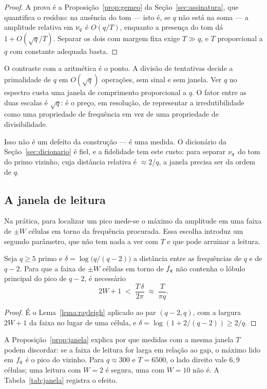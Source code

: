 \begin{proof}
A prova é a Proposição~\ref{prop:gemeo} da Seção~\ref{sec:assinatura}, que
quantifica o resíduo: na ausência do tom — isto é, se $q$ não está na soma — a
amplitude relativa em $\nu_{q}$ é $O(q/T)$, enquanto a presença do tom dá
$1+O(\sqrt q/T)$. Separar os dois com margem fixa exige $T\gg q$, e $T$
proporcional a $q$ com constante adequada basta.
\end{proof}

O contraste com a aritmética é o ponto. A divisão de tentativas decide a
primalidade de $q$ em $O(\sqrt q)$ operações, sem sinal e sem janela. Ver $q$ no
espectro custa uma janela de comprimento proporcional a $q$. O fator entre as duas
escalas é $\sqrt q$: é o preço, em resolução, de representar a irredutibilidade
como uma propriedade de frequência em vez de uma propriedade de divisibilidade.

Isso não é um defeito da construção — é uma medida. O dicionário da
Seção~\ref{sec:dicionario} é fiel, e a fidelidade tem este custo: para separar
$\nu_{q}$ do tom do primo vizinho, cuja distância relativa é $\approx 2/q$, a
janela precisa ser da ordem de $q$.

\subsection{A janela de leitura}

Na prática, para localizar um pico mede-se o máximo da amplitude em uma faixa de
$\pm W$ células em torno da frequência procurada. Essa escolha introduz um segundo
parâmetro, que não tem nada a ver com $T$ e que pode arruinar a leitura.

\begin{proposicao}\label{prop:janela}
Seja $q\ge5$ primo e $\delta=\log\bigl(q/(q-2)\bigr)$ a distância entre as
frequências de $q$ e de $q-2$. Para que a faixa de $\pm W$ células em torno de
$f_{q}$ não contenha o lóbulo principal do pico de $q-2$, é necessário
\[
  2W+1 \;<\; \frac{T\,\delta}{2\pi} \;\approx\; \frac{T}{\pi q} .
\]
\end{proposicao}

\begin{proof}
É o Lema~\ref{lema:rayleigh} aplicado ao par $(q-2,q)$, com a largura $2W+1$ da
faixa no lugar de uma célula, e $\delta=\log(1+2/(q-2))\ge 2/q$.
\end{proof}

A Proposição~\ref{prop:janela} explica por que medidas com a mesma janela $T$
podem discordar: se a faixa de leitura for larga em relação ao gap, o máximo lido
em $f_{q}$ é o pico do vizinho. Para $q\approx300$ e $T=6500$, o lado direito
vale $6{,}9$ células; uma leitura com $W=2$ é segura, uma com $W=10$ não é. A
Tabela~\ref{tab:janela} registra o efeito.

